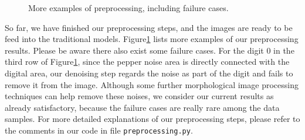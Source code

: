 \documentclass{article}
\begin{document}
\begin{figure}[!htb]
	
	\caption{More examples of preprocessing, including failure cases.}\label{fig:moreexample}
\end{figure}

So far, we have finished our preprocessing steps, and the images are ready to be feed into the traditional models. Figure\ref{fig:moreexample} lists more examples of our preprocessing results. Please be aware there also exist some failure cases. For the digit 0 in the third row of Figure\ref{fig:moreexample}, since the pepper noise area is directly connected with the digital area, our denoising step regards the noise as part of the digit and fails to remove it from the image. Although some further morphological image processing techniques can help remove these noises, we consider our current results as already satisfactory, because the failure cases are really rare among the data samples. For more detailed explanations of our preprocessing steps, please refer to the comments in our code in file \texttt{preprocessing.py}.
\end{document}
